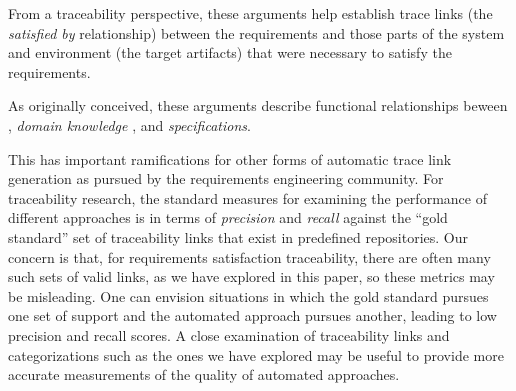 From a traceability perspective, these arguments help establish trace links (the \emph{satisfied by} relationship) between the requirements and those parts of the system and environment (the target artifacts) that were necessary to satisfy the requirements.

As originally conceived, these arguments describe functional relationships beween {\requirements}, {\em domain knowledge} , and {\em specifications}.


%

This has important ramifications for other forms of automatic trace link generation as pursued by the requirements engineering community.
For traceability research, the standard measures for examining the performance of different approaches is in terms of {\em precision} and {\em recall} against the ``gold standard'' set of traceability links that exist in predefined repositories.  Our concern is that, for requirements satisfaction traceability, there are often many such sets of valid links, as we have explored in this paper, so these metrics may be misleading.  One can envision situations in which the gold standard pursues one set of support and the automated approach pursues another, leading to low precision and recall scores.  A close examination of traceability links and categorizations such as the ones we have explored may be useful to provide more accurate measurements of the quality of automated approaches.
\fi
